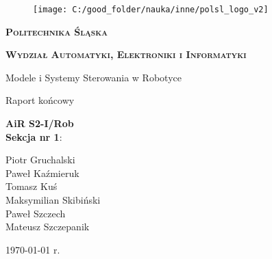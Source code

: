 \documentclass[11pt, a4paper]{article}
\begin{document}

\begin{titlepage}
{\LARGE
\begin{center}
	\begin{figure}[h!]
		\centering
		\texttt{[image: C:/good\_folder/nauka/inne/polsl\_logo\_v2]}
	\end{figure}
	
	\vspace{0.25cm}
	
	\textbf{\textsc{Politechnika Śląska}}
	
	\textbf{\textsc{Wydział Automatyki, Elektroniki i Informatyki}}
	
	\vspace{1.5cm}
	
	Modele i Systemy Sterowania w Robotyce
	
	\vspace{1.5cm}
	
	Raport końcowy
\end{center}
}

\vfill

{\Large
\noindent
\textbf{AiR S2-I/Rob}\\
\textbf{Sekcja nr 1}:

\noindent
\hspace*{0.5cm} Piotr Gruchalski\\
\hspace*{0.5cm} Paweł Kaźmieruk\\
\hspace*{0.5cm} Tomasz Kuś\\
\hspace*{0.5cm} Maksymilian Skibiński\\
\hspace*{0.5cm} Paweł Szczech\\
\hspace*{0.5cm} Mateusz Szczepanik\\


\vspace{0.5cm}
}

\begin{center}
\today{} r.
\end{center}
\end{titlepage}

\setcounter{page}{2}

\tableofcontents

\newpage
\end{document}
